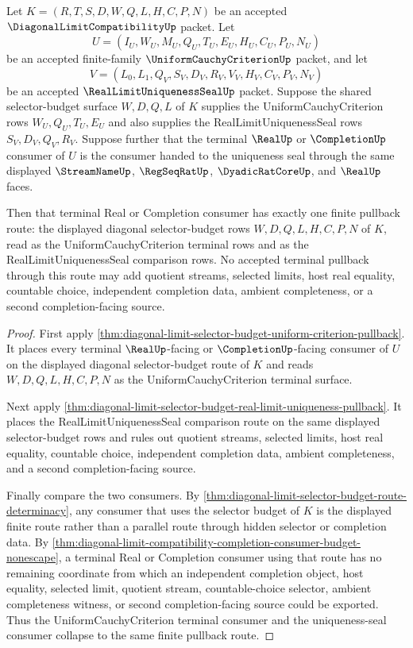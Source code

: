 \begin{theorem}
\label{thm:diagonal-limit-uniform-criterion-terminal-uniqueness-pullback}
Let $K=(R,T,S,D,W,Q,L,H,C,P,N)$ be an accepted $\DiagonalLimitCompatibilityUp$ packet. Let
$$
U=(I_U,W_U,M_U,Q_U,T_U,E_U,H_U,C_U,P_U,N_U)
$$
be an accepted finite-family $\UniformCauchyCriterionUp$ packet, and let
$$
V=(L_0,L_1,Q_V,S_V,D_V,R_V,V_V,H_V,C_V,P_V,N_V)
$$
be an accepted $\RealLimitUniquenessSealUp$ packet. Suppose the shared selector-budget surface $W,D,Q,L$ of $K$ supplies the UniformCauchyCriterion rows $W_U,Q_U,T_U,E_U$ and also supplies the RealLimitUniquenessSeal rows $S_V,D_V,Q_V,R_V$. Suppose further that the terminal $\RealUp$ or $\CompletionUp$ consumer of $U$ is the consumer handed to the uniqueness seal through the same displayed $\StreamNameUp$, $\RegSeqRatUp$, $\DyadicRatCoreUp$, and $\RealUp$ faces.

Then that terminal Real or Completion consumer has exactly one finite pullback route: the displayed diagonal selector-budget rows $W,D,Q,L,H,C,P,N$ of $K$, read as the UniformCauchyCriterion terminal rows and as the RealLimitUniquenessSeal comparison rows. No accepted terminal pullback through this route may add quotient streams, selected limits, host real equality, countable choice, independent completion data, ambient completeness, or a second completion-facing source.
\end{theorem}
\begin{proof}
First apply \autoref{thm:diagonal-limit-selector-budget-uniform-criterion-pullback}. It places every terminal $\RealUp$-facing or $\CompletionUp$-facing consumer of $U$ on the displayed diagonal selector-budget route of $K$ and reads $W,D,Q,L,H,C,P,N$ as the UniformCauchyCriterion terminal surface.

Next apply \autoref{thm:diagonal-limit-selector-budget-real-limit-uniqueness-pullback}. It places the RealLimitUniquenessSeal comparison route on the same displayed selector-budget rows and rules out quotient streams, selected limits, host real equality, countable choice, independent completion data, ambient completeness, and a second completion-facing source.

Finally compare the two consumers. By \autoref{thm:diagonal-limit-selector-budget-route-determinacy}, any consumer that uses the selector budget of $K$ is the displayed finite route rather than a parallel route through hidden selector or completion data. By \autoref{thm:diagonal-limit-compatibility-completion-consumer-budget-nonescape}, a terminal Real or Completion consumer using that route has no remaining coordinate from which an independent completion object, host equality, selected limit, quotient stream, countable-choice selector, ambient completeness witness, or second completion-facing source could be exported. Thus the UniformCauchyCriterion terminal consumer and the uniqueness-seal consumer collapse to the same finite pullback route.
\end{proof}

